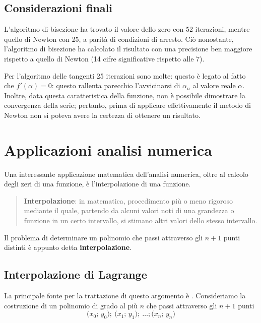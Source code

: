 \section{Considerazioni finali}

L'algoritmo di bisezione ha trovato il valore dello zero con 52 iterazioni, mentre quello di Newton con 25, a parità di condizioni di arresto. Ciò nonostante, l'algoritmo di bisezione ha calcolato il risultato con una precisione ben maggiore rispetto a quello di Newton (14 cifre significative rispetto alle 7).

Per l'algoritmo delle tangenti 25 iterazioni sono molte: questo è legato al fatto che $f'(\alpha)=0$: questo rallenta parecchio l'avvicinarsi di $\alpha_n$ al valore reale $\alpha$. Inoltre, data questa caratteristica della funzione, non è possibile dimostrare la convergenza della serie; pertanto, prima di applicare effettivamente il metodo di Newton non si poteva avere la certezza di ottenere un risultato.

\chapter{Applicazioni analisi numerica}

Una interessante applicazione matematica dell'analisi numerica, oltre al calcolo degli zeri di una funzione, è l'interpolazione di una funzione.
\begin{quotation}
\noindent \textbf{Interpolazione}: in matematica, procedimento più o meno rigoroso mediante il quale, partendo da alcuni valori noti di una grandezza o funzione in un certo intervallo, si stimano altri valori dello stesso intervallo.
\end{quotation}

Il problema di determinare un polinomio che passi attraverso gli $n+1$ punti distinti è appunto detta \textbf{interpolazione}.

\section{Interpolazione di Lagrange}

La principale fonte per la trattazione di questo argomento è \parencite[106-114]{num:an}. Consideriamo la costruzione di un polinomio di grado al più $n$ che passi attraverso gli $n+1$ punti
\[
\big(x_0;\,y_0\big);\:\big(x_1;\,y_1\big);\:\dots;\big(x_n;\,y_n\big)
\]


